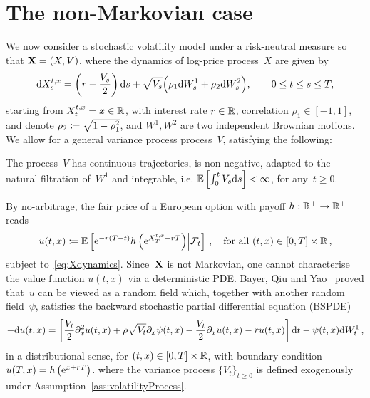 
\section{The non-Markovian case}\label{sec:non-Markovian_case}

We now consider a stochastic volatility model under a risk-neutral measure so that $\mathbf{X}=\nobreak(X, V)$, where the dynamics of log-price process~$X$ are given by
\begin{equation}\label{eq:Xdynamics}
\mathrm{d} X_{s}^{t, x} = \left(r-\frac{V_{s}}{2}\right)\mathrm{d} s
 + \sqrt{V_{s}}\Big(\rho_1 \mathrm{d} W^1_{s} + \rho_2 \mathrm{d} W^2_{s}\Big), \qquad 0 \leq t \leq s \leq T,
\end{equation}
starting from 
$X_{t}^{t, x} =x\in\mathbb{R}$,
with interest rate $r\in\mathbb{R}$,
correlation $\rho_1 \in [-1,1]$,
and denote $\rho_2\coloneqq \sqrt{1-\rho_1^{2}}$,
and $W^1, W^2$ are two independent Brownian motions.
We allow for a general variance process process~$V$, satisfying the following:
\begin{samepage}
\begin{assumption}\label{ass:volatilityProcess}
The process~$V$ has continuous trajectories, is non-negative, adapted to the natural filtration of~$W^1$ and integrable, i.e.
$\mathbb{E}\left[\int_{0}^{t} V_{s} \mathrm{d} s\right]<\infty$, for any~$t\geq 0$.
\end{assumption}
\end{samepage}
By no-arbitrage, the fair price of a European option with payoff $h:\mathbb{R}^+\rightarrow\mathbb{R}^+$ reads
$$
u(t, x) \coloneqq \mathbb{E}\left[\mathrm{e}^{-r(T-t)} h\left(\mathrm{e}^{X_{T}^{t, x}+r T}\right) \middle\vert \mathcal{F}_{t}\right]\,, 
\quad \text{for all } (t, x) \in[0, T] \times \mathbb{R}\,,
$$
subject to~\eqref{eq:Xdynamics}.
Since~$\mathbf{X}$ is not Markovian, one cannot characterise the value function $u(t, x)$ via a deterministic PDE. 
Bayer, Qiu and Yao~\cite{Bayer2022PricingSPDEs} proved that~$u$ can be viewed as a random field which, together with another random field~$\psi$, satisfies the backward stochastic partial differential equation (BSPDE)
\begin{equation}\label{eq:BSPDEPricing}
-\mathrm{d} u(t,x) = \left[\frac{V_{t}}{2} \partial_x^{2} u(t, x)+\rho \sqrt{V_{t}} \partial_x \psi(t,x)-\frac{V_{t}}{2} \partial_x u(t,x)-r u(t,x)\right] \mathrm{d} t-\psi(t,x) \mathrm{d} W^1_{t}\,,
\end{equation}
in a distributional sense, for $(t, x) \in[0, T] \times \mathbb{R}$, with boundary condition~${u(T, x) = h\left(\mathrm{e}^{x+r T}\right)}$.
where the variance process $\{V_{t}\}_{t \geq 0}$ is defined exogenously under Assumption~\ref{ass:volatilityProcess}. 
